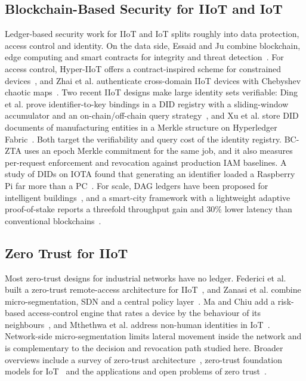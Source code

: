 \documentclass[a4paper,5p,times,twocolumn,number,sort&compress]{elsarticle}
\begin{document}
\subsection{Blockchain-Based Security for IIoT and IoT}

Ledger-based security work for IIoT and IoT splits roughly into data protection, access control and identity. On the data side, Essaid and Ju combine blockchain, edge computing and smart contracts for integrity and threat detection~\cite{essaid}. For access control, Hyper-IIoT offers a contract-inspired scheme for constrained devices~\cite{li_hyper}, and Zhai et al. authenticate cross-domain IIoT devices with Chebyshev chaotic maps~\cite{zhai}. Two recent IIoT designs make large identity sets verifiable: Ding et al. prove identifier-to-key bindings in a DID registry with a sliding-window accumulator and an on-chain/off-chain query strategy~\cite{ding25}, and Xu et al. store DID documents of manufacturing entities in a Merkle structure on Hyperledger Fabric~\cite{xu25}. Both target the verifiability and query cost of the identity registry. BC-ZTA uses an epoch Merkle commitment for the same job, and it also measures per-request enforcement and revocation against production IAM baselines. A study of DIDs on IOTA found that generating an identifier loaded a Raspberry Pi far more than a PC~\cite{ramirez}. For scale, DAG ledgers have been proposed for intelligent buildings~\cite{naqvi}, and a smart-city framework with a lightweight adaptive proof-of-stake reports a threefold throughput gain and 30\% lower latency than conventional blockchains~\cite{islam}.

\subsection{Zero Trust for IIoT}

Most zero-trust designs for industrial networks have no ledger. Federici et al. built a zero-trust remote-access architecture for IIoT~\cite{federici}, and Zanasi et al. combine micro-segmentation, SDN and a central policy layer~\cite{zanasi}. Ma and Chiu add a risk-based access-control engine that rates a device by the behaviour of its neighbours~\cite{ma}, and Mthethwa et al. address non-human identities in IoT~\cite{mthethwa}. Network-side micro-segmentation limits lateral movement inside the network and is complementary to the decision and revocation path studied here. Broader overviews include a survey of zero-trust architecture~\cite{syed22}, zero-trust foundation models for IoT~\cite{li_ztfm} and the applications and open problems of zero trust~\cite{ghasemshirazi}.
\end{document}
